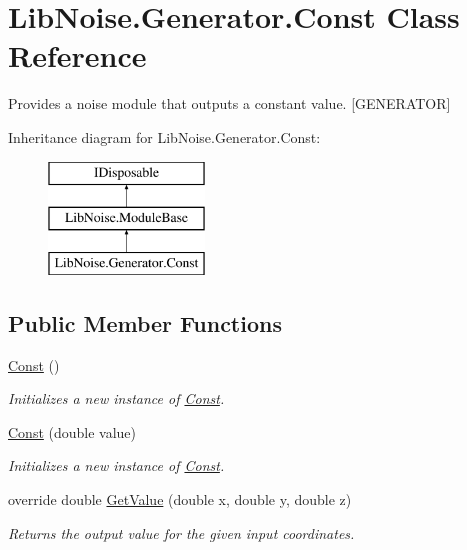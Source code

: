 \hypertarget{class_lib_noise_1_1_generator_1_1_const}{}\section{Lib\+Noise.\+Generator.\+Const Class Reference}
\label{class_lib_noise_1_1_generator_1_1_const}


Provides a noise module that outputs a constant value. \mbox{[}G\+E\+N\+E\+R\+A\+T\+OR\mbox{]}  


Inheritance diagram for Lib\+Noise.\+Generator.\+Const\+:\begin{figure}[H]
\begin{center}
\leavevmode
\includegraphics[height=3.000000cm]{class_lib_noise_1_1_generator_1_1_const}
\end{center}
\end{figure}
\subsection*{Public Member Functions}
\begin{DoxyCompactItemize}
\item 
\hyperlink{class_lib_noise_1_1_generator_1_1_const_af8fc795830be88e69bdbbd3b4546c6be}{Const} ()
\begin{DoxyCompactList}\small\item\em Initializes a new instance of \hyperlink{class_lib_noise_1_1_generator_1_1_const}{Const}. \end{DoxyCompactList}\item 
\hyperlink{class_lib_noise_1_1_generator_1_1_const_af156ba45a9004878c1b8bcf3af5bf4c3}{Const} (double value)
\begin{DoxyCompactList}\small\item\em Initializes a new instance of \hyperlink{class_lib_noise_1_1_generator_1_1_const}{Const}. \end{DoxyCompactList}\item 
override double \hyperlink{class_lib_noise_1_1_generator_1_1_const_a8381b39f997610c7a878cb0f703bcb7e}{Get\+Value} (double x, double y, double z)
\begin{DoxyCompactList}\small\item\em Returns the output value for the given input coordinates. \end{DoxyCompactList}\end{DoxyCompactItemize}
